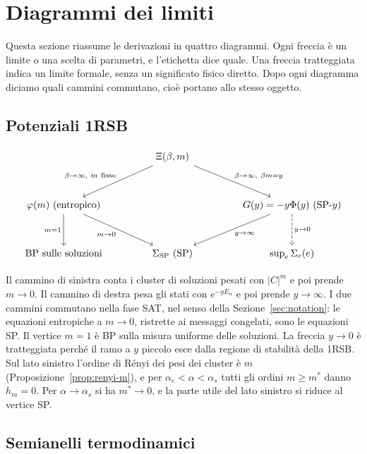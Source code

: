 \section{Diagrammi dei limiti}
\label{sec:diagrams}

Questa sezione riassume le derivazioni in quattro diagrammi.
Ogni freccia è un limite o una scelta di parametri, e l'etichetta dice quale.
Una freccia tratteggiata indica un limite formale, senza un significato fisico diretto.
Dopo ogni diagramma diciamo quali cammini commutano, cioè portano allo stesso oggetto.

\subsection{Potenziali 1RSB}

\begin{equation*}
\begin{tikzcd}[column sep=4.2em,row sep=3.2em]
& \Xi(\beta,m) \arrow[dl,"{\beta\to\infty,\ m\ \text{fisso}}"'] \arrow[dr,"{\beta\to\infty,\ \beta m=y}"] & \\
\varphi(m)\ \text{(entropico)} \arrow[d,"m=1"'] \arrow[dr,"m\to0"'] & & G(y)=-y\Phi(y)\ \text{(SP-}y) \arrow[dl,"y\to\infty"] \arrow[d,dashed,"y\to0"] \\
\text{BP sulle soluzioni} & \Sig_{\mathrm{SP}}\ \text{(SP)} & \sup_e\Sig_e(e)
\end{tikzcd}
\end{equation*}

Il cammino di sinistra conta i cluster di soluzioni pesati con $|C|^m$ e poi prende $m\to0$.
Il cammino di destra pesa gli stati con $e^{-yE_\alpha}$ e poi prende $y\to\infty$.
I due cammini commutano nella fase SAT, nel senso della Sezione~\ref{sec:notation}: le equazioni entropiche a $m\to0$, ristrette ai messaggi congelati, sono le equazioni SP.
Il vertice $m=1$ è BP sulla misura uniforme delle soluzioni.
La freccia $y\to0$ è tratteggiata perché il ramo a $y$ piccolo esce dalla regione di stabilità della 1RSB.
Sul lato sinistro l'ordine di Rényi dei pesi dei cluster è $m$ (Proposizione~\ref{prop:renyi-m}), e per $\alpha_c<\alpha<\alpha_s$ tutti gli ordini $m\ge m^*$ danno $h_m=0$.
Per $\alpha\to\alpha_s$ si ha $m^*\to0$, e la parte utile del lato sinistro si riduce al vertice SP.

\subsection{Semianelli termodinamici}


